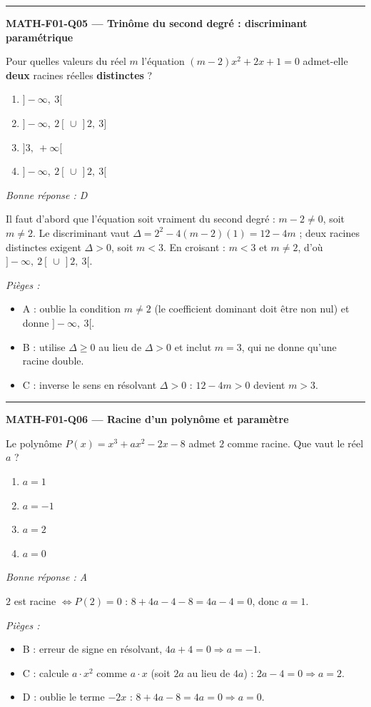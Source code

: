 \documentclass[11pt,a4paper]{article}
\begin{document}
\vspace{8pt}\hrule\vspace{8pt}
\noindent\textbf{MATH-F01-Q05 --- Trinôme du second degré : discriminant paramétrique}\par
Pour quelles valeurs du r\'eel $m$ l'\'equation $(m-2)x^{2}+2x+1=0$ admet-elle \textbf{deux} racines r\'eelles \textbf{distinctes} ?
\begin{enumerate}[label=\Alph*)]
\item $]-\infty,\ 3[$
\item $]-\infty,\ 2[\,\cup\,]2,\ 3]$
\item $]3,\ +\infty[$
\item $]-\infty,\ 2[\,\cup\,]2,\ 3[$
\end{enumerate}
\textit{Bonne réponse : D}\par
Il faut d'abord que l'\'equation soit vraiment du second degr\'e : $m-2\neq 0$, soit $m\neq 2$. Le discriminant vaut $\Delta=2^{2}-4(m-2)(1)=12-4m$ ; deux racines distinctes exigent $\Delta>0$, soit $m<3$. En croisant : $m<3$ et $m\neq 2$, d'o\`u $]-\infty,\ 2[\,\cup\,]2,\ 3[$.\par
\textit{Pièges :}
\begin{itemize}
\item A : oublie la condition $m\neq 2$ (le coefficient dominant doit \^etre non nul) et donne $]-\infty,\ 3[$.
\item B : utilise $\Delta\ge 0$ au lieu de $\Delta>0$ et inclut $m=3$, qui ne donne qu'une racine double.
\item C : inverse le sens en r\'esolvant $\Delta>0$ : $12-4m>0$ devient $m>3$.
\end{itemize}
\vspace{8pt}\hrule\vspace{8pt}
\noindent\textbf{MATH-F01-Q06 --- Racine d'un polynôme et paramètre}\par
Le polyn\^ome $P(x)=x^{3}+ax^{2}-2x-8$ admet $2$ comme racine. Que vaut le r\'eel $a$ ?
\begin{enumerate}[label=\Alph*)]
\item $a=1$
\item $a=-1$
\item $a=2$
\item $a=0$
\end{enumerate}
\textit{Bonne réponse : A}\par
$2$ est racine $\Leftrightarrow P(2)=0$ : $8+4a-4-8=4a-4=0$, donc $a=1$.\par
\textit{Pièges :}
\begin{itemize}
\item B : erreur de signe en r\'esolvant, $4a+4=0\Rightarrow a=-1$.
\item C : calcule $a\cdot x^2$ comme $a\cdot x$ (soit $2a$ au lieu de $4a$) : $2a-4=0\Rightarrow a=2$.
\item D : oublie le terme $-2x$ : $8+4a-8=4a=0\Rightarrow a=0$.
\end{itemize}
\end{document}
